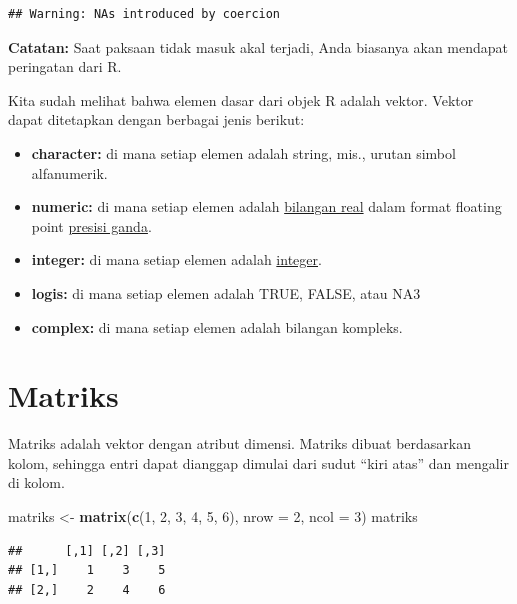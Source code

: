 \documentclass[
]{book}
\newenvironment{Shaded}{\begin{snugshade}}{\end{snugshade}}
\newcommand{\AttributeTok}[1]{\textcolor[rgb]{0.13,0.29,0.53}{#1}}
\newcommand{\DecValTok}[1]{\textcolor[rgb]{0.00,0.00,0.81}{#1}}
\newcommand{\FunctionTok}[1]{\textcolor[rgb]{0.13,0.29,0.53}{\textbf{#1}}}
\newcommand{\NormalTok}[1]{#1}
\newcommand{\OtherTok}[1]{\textcolor[rgb]{0.56,0.35,0.01}{#1}}
\providecommand{\tightlist}{%
  \setlength{\itemsep}{0pt}\setlength{\parskip}{0pt}}
\begin{document}
\begin{verbatim}
## Warning: NAs introduced by coercion
\end{verbatim}

\textbf{Catatan:} Saat paksaan tidak masuk akal terjadi, Anda biasanya akan mendapat peringatan dari R.

Kita sudah melihat bahwa elemen dasar dari objek R adalah vektor. Vektor dapat ditetapkan dengan berbagai jenis berikut:

\begin{itemize}
\tightlist
\item
  \textbf{character:} di mana setiap elemen adalah string, mis., urutan simbol alfanumerik.
\item
  \textbf{numeric:} di mana setiap elemen adalah \href{https://en.wikipedia.org/wiki/Real_number}{bilangan real} dalam format floating point \href{https://en.wikipedia.org/wiki/Double-precision_floating-point_format}{presisi ganda}.
\item
  \textbf{integer:} di mana setiap elemen adalah \href{https://en.wikipedia.org/wiki/Integer}{integer}.
\item
  \textbf{logis:} di mana setiap elemen adalah TRUE, FALSE, atau NA3
\item
  \textbf{complex:} di mana setiap elemen adalah bilangan kompleks.
\end{itemize}

\hypertarget{matriks}{%
\section{Matriks}\label{matriks}}

Matriks adalah vektor dengan atribut dimensi. Matriks dibuat berdasarkan kolom, sehingga entri dapat dianggap dimulai dari sudut ``kiri atas'' dan mengalir di kolom.

\begin{Shaded}
\begin{Highlighting}[]
\NormalTok{matriks }\OtherTok{\textless{}{-}} \FunctionTok{matrix}\NormalTok{(}\FunctionTok{c}\NormalTok{(}\DecValTok{1}\NormalTok{, }\DecValTok{2}\NormalTok{, }\DecValTok{3}\NormalTok{, }\DecValTok{4}\NormalTok{, }\DecValTok{5}\NormalTok{, }\DecValTok{6}\NormalTok{), }\AttributeTok{nrow =} \DecValTok{2}\NormalTok{, }\AttributeTok{ncol =} \DecValTok{3}\NormalTok{)}
\NormalTok{matriks}
\end{Highlighting}
\end{Shaded}

\begin{verbatim}
##      [,1] [,2] [,3]
## [1,]    1    3    5
## [2,]    2    4    6
\end{verbatim}
\end{document}
